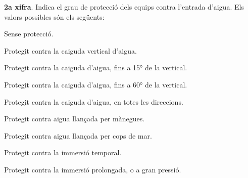\textbf{2a xifra}. Indica el grau de protecci\'{o} dels equips contra
l'entrada d'aigua. Els valors possibles s\'{o}n els seg\"{u}ents: \pagebreak
\begin{multicols}{2}
\begin{list}{}
   {\setlength{\labelwidth}{4.5mm} \setlength{\leftmargin}{4.5mm} \setlength{\labelsep}{2mm}}
   \item[\textbf{0}] Sense protecci\'{o}.
   \item[\textbf{1}] Protegit contra la caiguda vertical d'aigua.
   \item[\textbf{2}] Protegit contra la caiguda d'aigua, fins a 15\unit{\degree} de la  vertical.
   \item[\textbf{3}] Protegit contra la caiguda d'aigua, fins a 60\unit{\degree} de la  vertical.
   \item[\textbf{4}] Protegit contra la caiguda d'aigua, en totes les direccions.
   \item[\textbf{5}] Protegit contra aigua llan\c{c}ada per m\`{a}negues.
   \item[\textbf{6}] Protegit contra aigua llan\c{c}ada per cops de mar.
   \item[\textbf{7}] Protegit contra la immersi\'{o} temporal.
   \item[\textbf{8}] Protegit contra la immersi\'{o} prolongada, o a gran pressi\'{o}.
\end{list}
\end{multicols}

